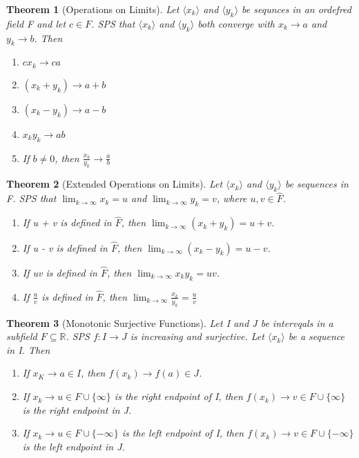 \documentclass[11pt, oneside]{book}
\theoremstyle{break}
\newtheorem{thm}{Theorem}[section]
\newcommand{\bb}[1]{\mathbb{#1}}		%
\begin{document}
\begin{thm}[Operations on Limits]
	Let $\langle x_k \rangle$ and $\langle y_k \rangle$ be sequnces in an ordefred field F and let $c \in F$. SPS that $\langle x_k \rangle$ and $\langle y_k \rangle$ both converge with $x_k \to a$ and $y_k \to b$. Then
	\begin{enumerate}
		\item $ cx_k \to ca$
		\item $(x_k + y_k) \to a + b$
		\item $(x_k - y_k) \to a - b$
		\item $x_k y_k \to ab$
		\item If $b \neq 0$, then $\frac{x_k}{y_k} \to \frac{a}{b}$
	\end{enumerate}
\end{thm}

\begin{thm}[Extended Operations on Limits]
	Let $\langle x_k \rangle$ and $\langle y_k \rangle$ be sequences in F. SPS that $\lim_{k \to \infty} x_k = u$ and $\lim_{k \to \infty} y_k = v$, where $u, v \in \hat{F}$.
	\begin{enumerate}
		\item If u + v is defined in $\hat{F}$, then $\lim_{k \to \infty} (x_k + y_k) = u + v$.
		\item If u - v is defined in $\hat{F}$, then $\lim_{k \to \infty} (x_k - y_k) = u - v$.
		\item If uv is defined in $\hat{F}$, then $\lim_{k \to \infty} x_k y_k = uv$.
		\item If $\frac{u}{v}$ is defined in $\hat{F}$, then $\lim_{k \to \infty} \frac{x_k}{y_k} = \frac{u}{v}$
	\end{enumerate}
\end{thm}

\begin{thm}[Monotonic Surjective Functions]
	Let I and J be intervqals in a subfield $F \subseteq \bb{R}$. SPS $f: I \to J$ is increasing and surjective. Let $\langle x_k \rangle$ be a sequence in I. Then
	\begin{enumerate}
		\item If $x_K \to a \in I$, then $f(x_k) \to f(a) \in J$.
		\item If $x_k \to u \in F \cup \{\infty\}$ is the right endpoint of I, then $f(x_k) \to v \in F \cup \{\infty\}$ is the right endpoint in J.
		\item If $x_k \to u \in F \cup \{-\infty\}$ is the left endpoint of I, then $f(x_k) \to v \in F \cup \{-\infty\}$ is the left endpoint in J.
	\end{enumerate}
\end{thm}
\end{document}

